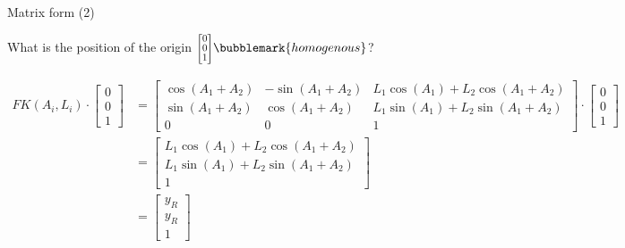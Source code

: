 \documentclass[compress]{beamer}
\newcommand{\colvec}[2][.8]{%
  \scalebox{#1}{%
    \renewcommand{\arraystretch}{.8}%
    $\begin{bmatrix}#2\end{bmatrix}$%
  }
}
\begin{document}
    \begin{frame}{Matrix form (2)}

    What is the position of the origin $\colvec{0 \\ 0 \\ 1}\bubblemark{homogenous}$?


    \pause
        \scriptsize
    \begin{align*}
        FK(A_i,L_i)\cdot \begin{bmatrix}0 \\ 0 \\ 1\end{bmatrix} &= \begin{bmatrix} \cos(A_1 + A_2) & -\sin(A_1 + A_2) & L_1 \cos(A_1) + L_2 \cos(A_1 + A_2) \\
                                                                                    \sin(A_1 + A_2) & \cos(A_1 + A_2) & L_1 \sin(A_1) + L_2 \sin(A_1 + A_2) \\
                                                                                    0 & 0 & 1 \end{bmatrix}\cdot \begin{bmatrix}0 \\ 0 \\ 1\end{bmatrix} \\
                                                                 &= \begin{bmatrix}L_1 \cos(A_1) + L_2 \cos(A_1 + A_2) \\ L_1 \sin(A_1) + L_2 \sin(A_1 + A_2) \\ 1\end{bmatrix} \\
                                                                 &= \begin{bmatrix}y_R \\ y_R \\ 1\end{bmatrix}
    \end{align*}


\end{frame}
\end{document}
